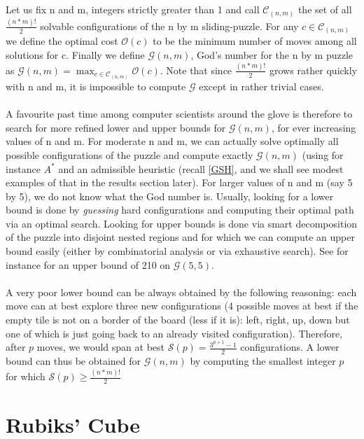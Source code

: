 Let us fix n and m, integers strictly greater than 1 and call $\mathcal{C}_{(n, m)}$ the set of all $\frac{(n * m)!}{2}$ solvable configurations of the n by m sliding-puzzle. For any $c \in \mathcal{C}_{(n, m)}$ we define the optimal cost $\mathcal{O}(c)$ to be the minimum number of moves among all solutions for c. Finally we define $\mathcal{G}(n, m)$, God's number for the n by m puzzle as  $\mathcal{G}(n, m) = \max_{c \in \mathcal{C}_{(n, m)}} \mathcal{O}(c)$. Note that since $\frac{(n * m)!}{2}$ grows rather quickly with n and m, it is impossible to compute $\mathcal{G}$ except in rather trivial cases.
\\
\\
A favourite past time among computer scientists around the glove is therefore to search for more refined lower and upper bounds for $\mathcal{G}(n, m)$, for ever increasing values of n and m. For moderate n and m, we can actually solve optimally all possible configurations of the puzzle and compute exactly $\mathcal{G}(n, m)$  (using for instance $A^{*}$ and an admissible heuristic (recall \ref{GSH}, and we shall see modest examples of that in the results section later). For larger values of n and m (say 5 by 5), we do not know what the God number is. Usually, looking for a lower bound is done by \textit{guessing} hard configurations and computing their optimal path via an optimal search. Looking for upper bounds is done via smart decomposition of the puzzle into disjoint nested regions and for which we can compute an upper bound easily (either by combinatorial analysis or via exhaustive search). See for instance \cite{KarlemoOstergard} for an upper bound of 210 on $\mathcal{G}(5, 5)$.
\\
\\
A very poor lower bound can be always obtained by the following reasoning: each move can at best explore three new configurations (4 possible moves at best if the empty tile is not on a border of the board (less if it is): left, right, up, down but one of which is just going back to an already visited configuration). Therefore, after $p$ moves, we would span at best $\mathcal{S}(p) = \frac{3^{p+1} - 1}{2}$ configurations. A lower bound can thus be obtained for $\mathcal{G}(n, m)$ by computing the smallest integer $p$ for which $\mathcal{S}(p) \ge \frac{(n * m)!}{2}$


\section{Rubiks' Cube}

\cite{RubiksChicago}
\\
\cite{RubiksRadu}


